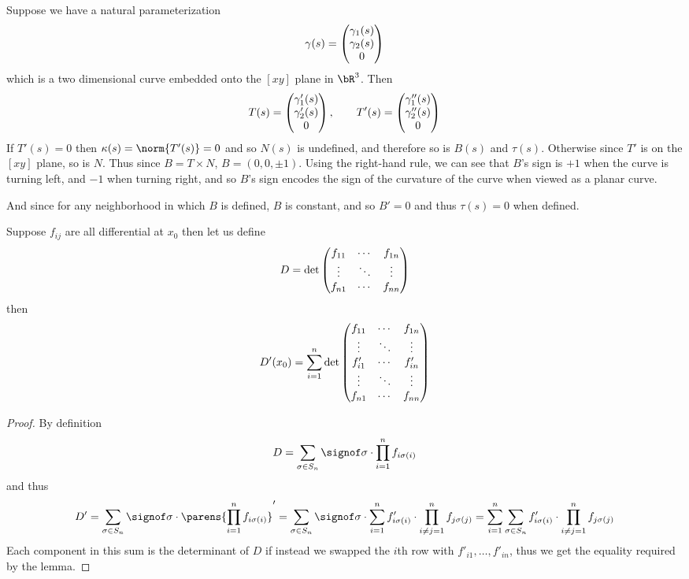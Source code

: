 \begin{exam*}

    Suppose we have a natural parameterization
    \[ \gamma(s) = \begin{pmatrix}\gamma_1(s) \\ \gamma_2(s) \\ 0\end{pmatrix} \]
    which is a two dimensional curve embedded onto the $[xy]$ plane in $\bR^3$.
    Then
    \[ T(s) = \begin{pmatrix}\gamma'_1(s) \\ \gamma'_2(s) \\ 0\end{pmatrix},\qquad T'(s) = \begin{pmatrix}\gamma''_1(s) \\ \gamma''_2(s) \\ 0\end{pmatrix} \]
    If $T'(s)=0$ then $\kappa(s)=\norm{T'(s)}=0$ and so $N(s)$ is undefined, and therefore so is $B(s)$ and $\tau(s)$.
    Otherwise since $T'$ is on the $[xy]$ plane, so is $N$.
    Thus since $B=T\times N$, $B=(0,0,\pm1)$.
    Using the right-hand rule, we can see that $B$'s sign is $+1$ when the curve is turning left, and $-1$ when turning right, and so $B$'s sign encodes the sign of the curvature of the curve when viewed
    as a planar curve.

    And since for any neighborhood in which $B$ is defined, $B$ is constant, and so $B'=0$ and thus $\tau(s)=0$ when defined.

\end{exam*}

\begin{lemm*}

    Suppose $f_{ij}$ are all differential at $x_0$ then let us define
    \[ D = \det\begin{pmatrix}f_{11} & \cdots & f_{1n} \\ \vdots & \ddots & \vdots \\ f_{n1} & \cdots & f_{nn}\end{pmatrix} \]
    then
    \[ D'(x_0) = \sum_{i=1}^n \det\begin{pmatrix}f_{11} & \cdots & f_{1n} \\ \vdots & \ddots & \vdots \\ f'_{i1} & \cdots & f'_{in} \\ \vdots & \ddots & \vdots \\ f_{n1} & \cdots & f_{nn}\end{pmatrix} \]

\end{lemm*}

\begin{proof}

    By definition
    \[ D = \sum_{\sigma\in S_n}\signof\sigma\cdot\prod_{i=1}^n f_{i\sigma(i)} \]
    and thus
    \[ D' = \sum_{\sigma\in S_n}\signof\sigma\cdot\parens{\prod_{i=1}^n f_{i\sigma(i)}}' = \sum_{\sigma\in S_n}\signof\sigma\cdot\sum_{i=1}^n f'_{i\sigma(i)}\cdot\prod_{i\neq j=1}^n f_{j\sigma(j)} 
    = \sum_{i=1}^n\sum_{\sigma\in S_n} f'_{i\sigma(i)}\cdot\prod_{i\neq j=1}^n f_{j\sigma(j)} \]
    Each component in this sum is the determinant of $D$ if instead we swapped the $i$th row with $f'_{i1},\dots,f'_{in}$, thus we get the equality required by the lemma.

\end{proof}

